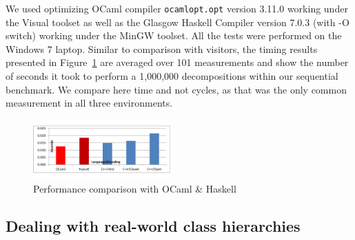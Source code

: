 

We used optimizing OCaml compiler \texttt{ocamlopt.opt} version 3.11.0 working 
under the Visual \Cpp{} toolset as well as the Glasgow Haskell Compiler version 
7.0.3 (with -O switch) working under the MinGW toolset. All the tests were 
performed on the Windows 7 laptop. Similar to comparison with visitors,
the timing results presented in Figure~\ref{fig:OCamlComparison} are averaged 
over 101 measurements and show the number of seconds it took to perform a 
1,000,000 decompositions within our sequential benchmark. We compare here time 
and not cycles, as that was the only common measurement in all three 
environments.

\begin{figure}[htbp]
  \centering
    \includegraphics[width=0.47\textwidth]{OCamlComparison.pdf}
  \caption{Performance comparison with OCaml \& Haskell}
  \label{fig:OCamlComparison}
\end{figure}


\subsection{Dealing with real-world class hierarchies}
\label{sec:hierarchies}


